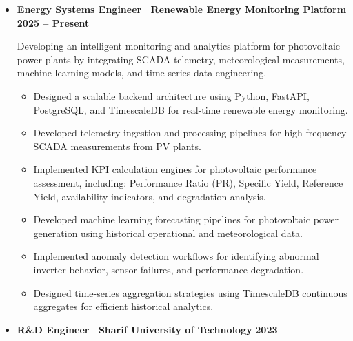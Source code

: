 \documentclass[letter,20pt]{article}
\begin{document}
\begin{itemize}
[
noitemsep,
topsep=5pt,
leftmargin=2ex
]


\item[]
\textbf{
Energy Systems Engineer \textbar\ Renewable Energy Monitoring Platform
}
\hfill
\textbf{2025 -- Present}


\vspace{4pt}


Developing an intelligent monitoring and analytics platform for photovoltaic power plants by integrating SCADA telemetry, meteorological measurements, machine learning models, and time-series data engineering.



\begin{itemize}
[
noitemsep,
leftmargin=4ex
]


\item
Designed a scalable backend architecture using Python, FastAPI, PostgreSQL, and TimescaleDB for real-time renewable energy monitoring.

\item
Developed telemetry ingestion and processing pipelines for high-frequency SCADA measurements from PV plants.

\item
Implemented KPI calculation engines for photovoltaic performance assessment, including:
Performance Ratio (PR), Specific Yield, Reference Yield, availability indicators, and degradation analysis.

\item
Developed machine learning forecasting pipelines for photovoltaic power generation using historical operational and meteorological data.

\item
Implemented anomaly detection workflows for identifying abnormal inverter behavior, sensor failures, and performance degradation.

\item
Designed time-series aggregation strategies using TimescaleDB continuous aggregates for efficient historical analytics.

\end{itemize}



\vspace{10pt}



\item[]
\textbf{
R\&D Engineer \textbar\ Sharif University of Technology
}
\hfill
\textbf{2023}



\end{itemize}
\end{document}
